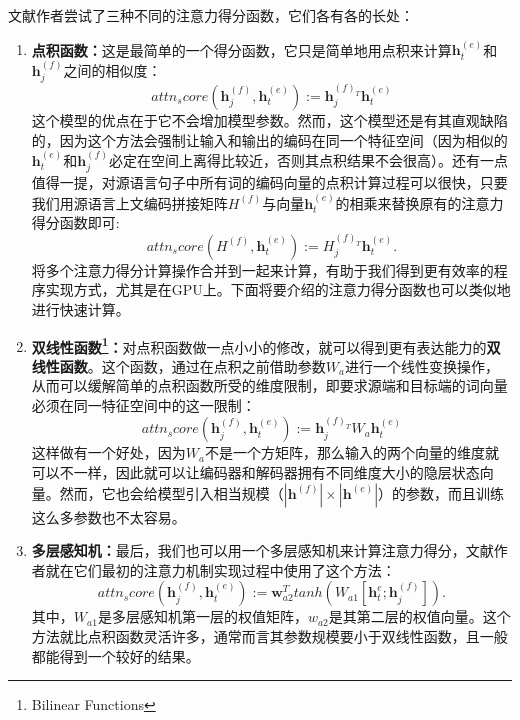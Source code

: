 \documentclass[10pt,a4paper]{ctexart}
\begin{document}
文献\cite{luong2015effective}作者尝试了三种不同的注意力得分函数，它们各有各的长处：
\begin{enumerate}
\item[] \textbf{点积函数：}这是最简单的一个得分函数，它只是简单地用点积来计算$\textbf{h}_t^{(e)}$和$\textbf{h}_j^{(f)}$之间的相似度：
\begin{equation}\label{eq:77}
 attn_score(\textbf{h}_j^{(f)},\textbf{h}_t^{(e)}) := \textbf{h}_j^{(f)_{T}}\textbf{h}_t^{(e)}
\end{equation}
这个模型的优点在于它不会增加模型参数。然而，这个模型还是有其直观缺陷的，因为这个方法会强制让输入和输出的编码在同一个特征空间（因为相似的$\textbf{h}_t^{(e)}$和$\textbf{h}_j^{(f)}$必定在空间上离得比较近，否则其点积结果不会很高）。还有一点值得一提，对源语言句子中所有词的编码向量的点积计算过程可以很快，只要我们用源语言上文编码拼接矩阵$H^{(f)}$与向量$\textbf{h}_t^{(e)}$的相乘来替换原有的注意力得分函数即可:
\begin{equation}\label{eq:78}
 attn_score(H^{(f)}, \textbf{h}_t^{(e)}) := H_j^{(f)_T}\textbf{h}_t^{(e)}.
\end{equation}
将多个注意力得分计算操作合并到一起来计算，有助于我们得到更有效率的程序实现方式，尤其是在GPU上。下面将要介绍的注意力得分函数也可以类似地进行快速计算。
\item[] \textbf{双线性函数\footnote{Bilinear Functions}：}对点积函数做一点小小的修改，就可以得到更有表达能力的\textbf{双线性函数}。这个函数，通过在点积之前借助参数$W_a$进行一个线性变换操作，从而可以缓解简单的点积函数所受的维度限制，即要求源端和目标端的词向量必须在同一特征空间中的这一限制：
\begin{equation}\label{eq:79}
 attn_score(\textbf{h}_j^{(f)},\textbf{h}_t^{(e)}) := \textbf{h}_j^{(f)_{T}}W_a\textbf{h}_t^{(e)}
\end{equation}
这样做有一个好处，因为$W_a$不是一个方矩阵，那么输入的两个向量的维度就可以不一样，因此就可以让编码器和解码器拥有不同维度大小的隐层状态向量。然而，它也会给模型引入相当规模（$|\textbf{h}^{(f)}| \times |\textbf{h}^{(e)}|$）的参数，而且训练这么多参数也不太容易。
\item[] \textbf{多层感知机：}最后，我们也可以用一个多层感知机来计算注意力得分，文献\cite{bahdanau2014neural}作者就在它们最初的注意力机制实现过程中使用了这个方法：
\begin{equation}\label{eq:80}
 attn_score(\textbf{h}_j^{(f)},\textbf{h}_t^{(e)}) := \textbf{w}_{a2}^{T}tanh(W_{a1}[\textbf{h}_t^{e};\textbf{h}_j^{(f)}]).
\end{equation}
其中，$W_{a1}$是多层感知机第一层的权值矩阵，$w_{a2}$是其第二层的权值向量。这个方法就比点积函数灵活许多，通常而言其参数规模要小于双线性函数，且一般都能得到一个较好的结果。
\end{enumerate}
\end{document}
